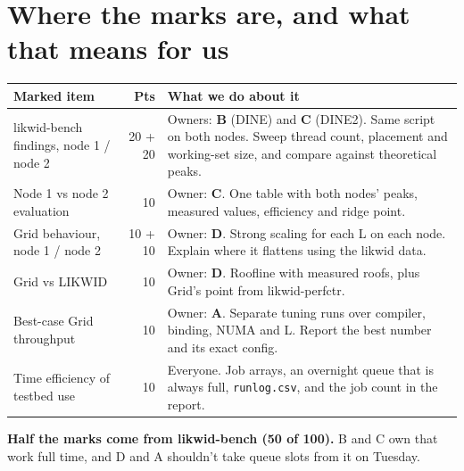 \documentclass[10pt,a4paper]{article}
\newcommand{\who}[1]{\textbf{\color{accent}#1}}
\begin{document}
\section{Where the marks are, and what that means for us}
\begin{tabularx}{\linewidth}{@{}l r L@{}}
\toprule
\textbf{Marked item} & \textbf{Pts} & \textbf{What we do about it}\\
\midrule
likwid-bench findings, node 1 / node 2 & 20 + 20 & Owners: \who{B} (DINE) and \who{C} (DINE2). Same script on both nodes. Sweep thread count, placement and working-set size, and compare against theoretical peaks.\\
 Node 1 vs node 2 evaluation & 10 & Owner: \who{C}. One table with both nodes' peaks, measured values, efficiency and ridge point.\\
Grid behaviour, node 1 / node 2 & 10 + 10 & Owner: \who{D}. Strong scaling for each L on each node. Explain where it flattens using the likwid data.\\
 Grid vs LIKWID & 10 & Owner: \who{D}. Roofline with measured roofs, plus Grid's point from likwid-perfctr.\\
Best-case Grid throughput & 10 & Owner: \who{A}. Separate tuning runs over compiler, binding, NUMA and L. Report the best number and its exact config.\\
 Time efficiency of testbed use & 10 & Everyone. Job arrays, an overnight queue that is always full, \texttt{runlog.csv}, and the job count in the report.\\
\bottomrule
\end{tabularx}

\textbf{Half the marks come from likwid-bench (50 of 100).} B and C own that work full time, and D and A shouldn't take queue slots from it on Tuesday.
\end{document}

